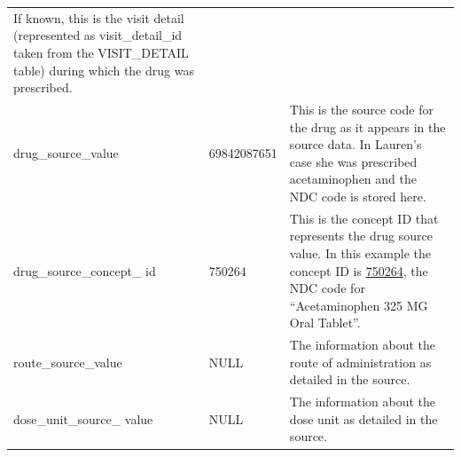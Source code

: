 \documentclass[11pt]{book}
\theoremstyle{definition}
\theoremstyle{definition}
\theoremstyle{definition}
\theoremstyle{remark}
\begin{document}
\begin{longtable}[]{@{}lll@{}}
\begin{minipage}[t]{0.49\columnwidth}
If known, this is the visit detail (represented as visit\_detail\_id taken from the VISIT\_DETAIL table) during which the drug was prescribed.\strut
\end{minipage}\tabularnewline
\begin{minipage}[t]{0.28\columnwidth}\raggedright
drug\_source\_value\strut
\end{minipage} & \begin{minipage}[t]{0.15\columnwidth}\raggedright
69842087651\strut
\end{minipage} & \begin{minipage}[t]{0.49\columnwidth}\raggedright
This is the source code for the drug as it appears in the source data. In Lauren's case she was prescribed acetaminophen and the NDC code is stored here.\strut
\end{minipage}\tabularnewline
\begin{minipage}[t]{0.28\columnwidth}\raggedright
drug\_source\_concept\_ id\strut
\end{minipage} & \begin{minipage}[t]{0.15\columnwidth}\raggedright
750264\strut
\end{minipage} & \begin{minipage}[t]{0.49\columnwidth}\raggedright
This is the concept ID that represents the drug source value. In this example the concept ID is \href{http://athena.ohdsi.org/search-terms/terms/750264}{750264}, the NDC code for ``Acetaminophen 325 MG Oral Tablet''.\strut
\end{minipage}\tabularnewline
\begin{minipage}[t]{0.28\columnwidth}\raggedright
route\_source\_value\strut
\end{minipage} & \begin{minipage}[t]{0.15\columnwidth}\raggedright
NULL\strut
\end{minipage} & \begin{minipage}[t]{0.49\columnwidth}\raggedright
The information about the route of administration as detailed in the source.\strut
\end{minipage}\tabularnewline
\begin{minipage}[t]{0.28\columnwidth}\raggedright
dose\_unit\_source\_ value\strut
\end{minipage} & \begin{minipage}[t]{0.15\columnwidth}\raggedright
NULL\strut
\end{minipage} & \begin{minipage}[t]{0.49\columnwidth}\raggedright
The information about the dose unit as detailed in the source.\strut
\end{minipage}\tabularnewline
\bottomrule
\end{longtable}
\end{document}
